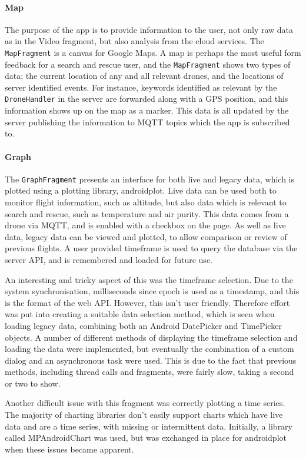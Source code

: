 \documentclass{article}
\begin{document}
\paragraph{Map}
The purpose of the app is to provide information to the user, not only raw data as in the Video fragment, but also analysis from the cloud services. The \texttt{MapFragment} is a canvas for Google Maps. A map is perhaps the most useful form feedback for a search and rescue user, and the \texttt{MapFragment} shows two types of data; the current location of any and all relevant drones, and the locations of server identified events. For instance, keywords identified as relevant by the \texttt{DroneHandler} in the server are forwarded along with a GPS position, and this information shows up on the map as a marker. This data is all updated by the server publishing the information to MQTT topics which the app is subscribed to.

\paragraph{Graph}
The \texttt{GraphFragment} presents an interface for both live and legacy data, which is plotted using a plotting library, androidplot. Live data can be used both to monitor flight information, such as altitude, but also data which is relevant to search and rescue, such as temperature and air purity. This data comes from a drone via MQTT, and is enabled with a checkbox on the page. As well as live data, legacy data can be viewed and plotted, to allow comparison or review of previous flights. A user provided timeframe is used to query the database via the server API, and is remembered and loaded for future use. 

An interesting and tricky aspect of this was the timeframe selection. Due to the system synchronisation, milliseconds since epoch is used as a timestamp, and this is the format of the web API. However, this isn't user friendly. Therefore effort was put into creating a suitable data selection method, which is seen when loading legacy data, combining both an Android DatePicker and TimePicker objects. A number of different methods of displaying the timeframe selection and loading the data were implemented, but eventually the combination of a custom dialog and an asynchronous task were used. This is due to the fact that previous methods, including thread calls and fragments, were fairly slow, taking a second or two to show. 

Another difficult issue with this fragment was correctly plotting a time series. The majority of charting libraries don't easily support charts which have live data and are a time series, with missing or intermittent data. Initially, a library called MPAndroidChart was used, but was exchanged in place for androidplot when these issues became apparent.   
\end{document}

